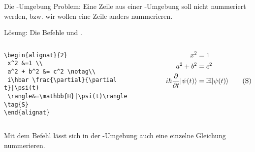\begin{frame}[fragile]{Die -Umgebung}
Problem: Eine Zeile aus einer -Umgebung soll nicht nummeriert werden, bzw. wir wollen eine Zeile anders nummerieren.

\medskip\pause
Lösung: Die Befehle  und .

\begin{columns}
\begin{column}{0.5\textwidth}
\begin{codeblock}
\begin{tiny}
\begin{verbatim}
\begin{alignat}{2}
 x^2 &=1 \\
 a^2 + b^2 &= c^2 \notag\\ 
 i\hbar \frac{\partial}{\partial t}|\psi(t)
 \rangle&=\mathbb{H}|\psi(t)\rangle \tag{S}
\end{alignat}
\end{verbatim}
\end{tiny}
\end{codeblock}
\end{column}
\begin{column}{0.45\textwidth}
\begin{alignat}{2}
 x^2 &=1 \\
 a^2 + b^2 &= c^2 \notag\\ 
 i\hbar \frac{\partial}{\partial t}|\psi(t)\rangle&=\mathbb{H}|\psi(t)\rangle \tag{S}
\end{alignat}
\end{column}
\end{columns}

\medskip\pause
Mit dem Befehl  lässt sich in der -Umgebung auch eine einzelne Gleichung nummerieren. 
\end{frame}


